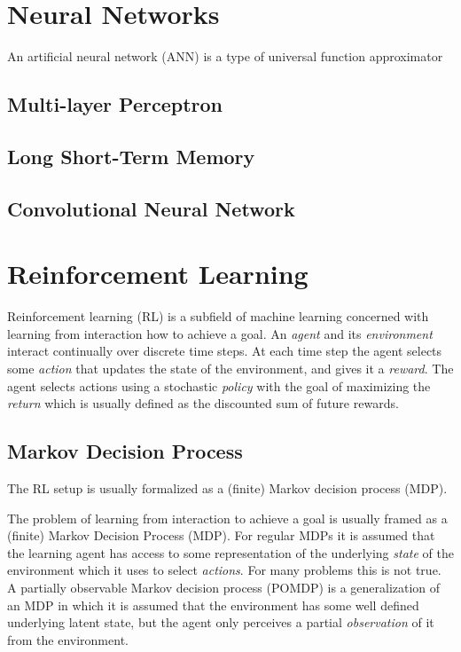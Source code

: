 \section{Neural Networks}

An artificial neural network (ANN) is a type of universal function approximator

\subsection{Multi-layer Perceptron}

\subsection{Long Short-Term Memory}

\subsection{Convolutional Neural Network}

\section{Reinforcement Learning}

Reinforcement learning (RL) is a subfield of machine learning concerned with learning from interaction how to achieve a goal.
An \textit{agent} and its \textit{environment} interact continually over discrete time steps.
At each time step the agent selects some \textit{action} that updates the state of the environment, and gives it a \textit{reward}.
The agent selects actions using a stochastic \textit{policy} with the goal of maximizing the \textit{return} which is usually defined as the discounted sum of future rewards.~\cite{sutton_reinforcement_2018}

\subsection{Markov Decision Process}


The RL setup is usually formalized as a (finite) Markov decision process (MDP).

The problem of learning from interaction to achieve a goal is usually framed as a (finite) Markov Decision Process (MDP).
For regular MDPs it is assumed that the learning agent has access to some representation of the underlying \textit{state} of the environment which it uses to select \textit{actions}.
For many problems this is not true.
A partially observable Markov decision process (POMDP) is a generalization of an MDP in which it is assumed that the environment has some well defined underlying latent state, but the agent only perceives a partial \textit{observation} of it from the environment. 

